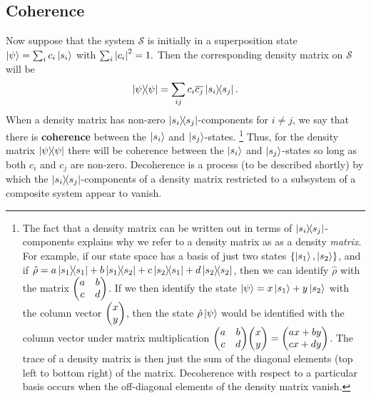 \documentclass[letter, 12pt]{turabian-thesis}
\theoremstyle{hypothesis}
\let\origfootnote\footnote %
\renewcommand{\footnote}[1]{%
\noindent %
\origfootnote{#1}}
\begin{document}
\subsection{Coherence}
Now suppose that the system $\mathcal{S}$ is initially in a superposition state $\ket{\psi}=\sum_i c_i\ket{s_i}$ with $\sum_i\abs{c_i}^2=1.$ Then the corresponding density matrix on $\mathcal{S}$ will be $$\dyad{\psi}=\sum_{ij} c_i\overline{c_j}\dyad{s_i}{s_j}.$$ When a density matrix has non-zero $\dyad{s_i}{s_j}$-components for $i\neq j$, we say that there is \textbf{coherence} between the  $\ket{s_i}$ and $\ket{s_j}$-states.\footnote{The fact that a density matrix can be written out in terms of $\dyad{s_i}{s_j}$-components explains why we refer to a density matrix as as a density \emph{matrix}. For example, if our state space has a basis of just two states $\{\ket{s_1},\ket{s_2}\}$, and if $\hat{\rho}=a\dyad{s_1}+b\dyad{s_1}{s_2}+c\dyad{s_2}{s_1}+d\dyad{s_2}$, then we can identify $\hat{\rho}$ with the matrix $\mqty(a & b \\ c & d)$. If we then identify the state $\ket{\psi}=x\ket{s_1}+y\ket{s_2}$ with the column vector $\mqty(x \\ y)$, then the state $\hat{\rho}\ket{\psi}$ would be identified with the column vector under matrix multiplication $\mqty(a & b \\ c & d) \mqty(x \\ y)=\mqty(ax+by \\ cx+dy)$. The trace of a density matrix is then just the sum of the diagonal elements (top left to bottom right) of the matrix. Decoherence with respect to a particular basis occurs when the off-diagonal elements of the density matrix vanish. } Thus, for the density matrix $\dyad{\psi}$ there will be coherence between the $\ket{s_i}$ and $\ket{s_j}$-states so long as both $c_i$ and $c_j$ are non-zero. Decoherence is a process (to be described shortly) by which the $\dyad{s_i}{s_j}$-components of a density matrix restricted to a subsystem of a composite system appear to vanish.  
\end{document}
